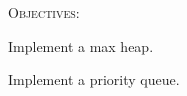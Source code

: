 
\textsc{Objectives:}
\begin{tightlist}
\item Implement a max heap.
\item Implement a priority queue.
\end{tightlist}


